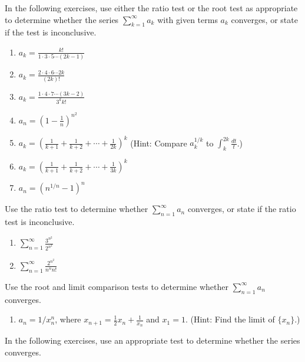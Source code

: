 \documentclass{exercises}
\begin{document}
In the following exercises, use either the ratio test or the root test as appropriate to determine whether the series $\sum_{k=1}^{\infty}a_{k}$ with given terms $a_{k}$ converges, or state if the test is inconclusive.

\begin{enumerate}[resume]
\item $a_{k}=\frac{k!}{1\cdot3\cdot5\cdots(2k-1)}$
\item $a_{k}=\frac{2\cdot4\cdot6\cdots2k}{(2k)!}$
\item $a_{k}=\frac{1\cdot4\cdot7\cdots(3k-2)}{3^{k}k!}$
\item $a_{n}={(1-\frac{1}{n})}^{n^{2}}$
\item $a_{k}=\left(\frac{1}{k+1}+\frac{1}{k+2}+\cdots+\frac{1}{2k}\right)^{k}$ (Hint: Compare $a_{k}^{1/k}$ to $\int_{k}^{2k}\frac{dt}{t}$.)
\item $a_{k}={(\frac{1}{k+1}+\frac{1}{k+2}+\cdots+\frac{1}{3k})}^{k}$
\item $a_{n}={(n^{1/n}-1)}^{n}$
\end{enumerate}

Use the ratio test to determine whether $\sum_{n=1}^{\infty}a_{n}$ converges, or state if the ratio test is inconclusive.

\begin{enumerate}[resume]
\item $\sum_{n=1}^{\infty}\frac{3^{n^{2}}}{2^{n^{3}}}$
\item $\sum_{n=1}^{\infty}\frac{2^{n^{2}}}{n^{n}n!}$
\end{enumerate}

Use the root and limit comparison tests to determine whether $\sum_{n=1}^{\infty}a_{n}$ converges.

\begin{enumerate}[resume]
\item $a_{n}=1/x_{n}^{n}$, where $x_{n+1}=\frac{1}{2}x_{n}+\frac{1}{x_{n}}$ and $x_{1}=1$. (Hint: Find the limit of $\{x_{n}\}$.)
\end{enumerate}

In the following exercises, use an appropriate test to determine whether the series converges.
\end{document}
